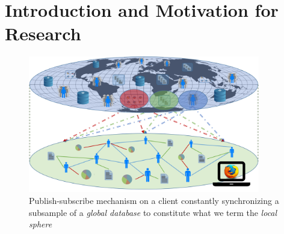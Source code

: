 \documentclass{llncs}
\begin{document}
\renewcommand{\thesubfigure}{\thefigure.\arabic{subfigure}}
\makeatletter
\renewcommand{\p@subfigure}{}
\renewcommand{\@thesubfigure}{\thesubfigure:\hskip\subfiglabelskip}
\makeatother


\section{Introduction and Motivation for Research}
\label{sect:intro_motivation}

\begin{figure}[H]
	\begin{center}
		\includegraphics[width=0.9\textwidth]{figures/local_sphere}
		\caption{Publish-subscribe mechanism on a client constantly synchronizing a subsample of a \textit{global database} to constitute what we term the \textit{local sphere}}
		\label{fig:anon_categories}
	\end{center}
\end{figure}



\cite{2003automaticKEfromWebDocuments}

\cite{leskovec2006recpatterns}
\cite{leskovec2006samplinggraphs}
\cite{leskovec2007blogpatterns}

\cite{mcmahan2016communication}
\cite{konevcny2016federatedlearning}
\cite{konevcny2016federatedoptimization}
\cite{2017secureaggregation}

\cite{shi2012reciprocalrank}


\newpage



\end{document}
